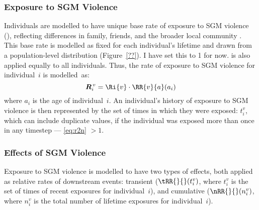 \subsubsection{Exposure to SGM Violence}\label{mod.par.evt.vex}
Individuals are modelled to have
unique base rate of exposure to SGM violence (),
reflecting differences in family, friends, and the broader local community
\cite{??}.
This base rate is modelled as
fixed for each individual's lifetime
and drawn from a population-level distribution (Figure~\ref{??}).
     {I have set this to 1 for now.}
 is also applied equally to all individuals.
Thus, the rate of
exposure to SGM violence for individual~$i$ is modelled~as:
\begin{equation}
  \Gi{v} = \Ri{v} \cdot \RR{v}{a}(a_i)
\end{equation}
where $a_i$ is the age of individual~$i$.
An individual's history of exposure to SGM violence
is then represented by the set of times in which they were exposed: $t^v_i$,
which can include duplicate values,
if the individual was exposed more than once in any timestep
--- \ie \eqref{eq:r2n} $> 1$.
\subsubsection{Effects of SGM Violence}\label{mod.par.evt.vef}
Exposure to SGM violence is modelled to have two types of effects,
both applied as relative rates of downstream events:
transient ($\tRR{}{}(t^v_i)$, where
$t^v_i$ is the set of times of recent exposures for individual~$i$), and
cumulative ($\nRR{}{}(n^v_i)$, where
$n^v_i$ is the total number of lifetime exposures for individual~$i$).
